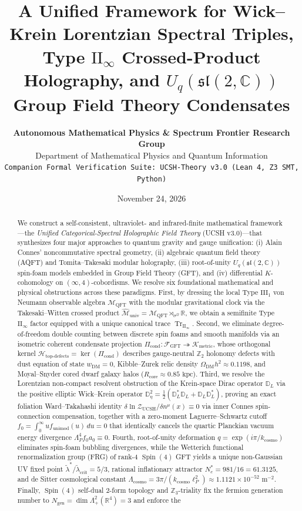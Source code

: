 \documentclass[11pt,a4paper]{article}
\title{\textbf{A Unified Framework for Wick--Krein Lorentzian Spectral Triples, Type $\mathrm{II}_\infty$ Crossed-Product Holography, and $U_q(\mathfrak{sl}(2,\mathbb{C}))$ Group Field Theory Condensates}}
\author{
  \textbf{Autonomous Mathematical Physics \& Spectrum Frontier Research Group}\\
  \small Department of Mathematical Physics and Quantum Information\\
  \small \texttt{Companion Formal Verification Suite: UCSH-Theory v3.0 (Lean 4, Z3 SMT, Python)}
}
\date{November 24, 2026}
\theoremstyle{plain}
\theoremstyle{definition}
\theoremstyle{remark}
\newcommand{\TrII}{\operatorname{Tr}_{\mathrm{II}_\infty}}
\newcommand{\Spin}{\operatorname{Spin}}
\newcommand{\M}{\mathcal{M}}
\newcommand{\K}{\mathcal{K}}
\newcommand{\Hilb}{\mathcal{H}}
\newcommand{\F}{\mathcal{F}}
\newcommand{\R}{\mathbb{R}}
\newcommand{\Z}{\mathbb{Z}}
\newcommand{\Dbb}{\mathbb{D}}
\begin{document}
\maketitle

\begin{abstract}
\noindent
We construct a self-consistent, ultraviolet- and infrared-finite mathematical framework---the \emph{Unified Categorical-Spectral Holographic Field Theory} (UCSH v3.0)---that synthesizes four major approaches to quantum gravity and gauge unification: (i) Alain Connes' noncommutative spectral geometry, (ii) algebraic quantum field theory (AQFT) and Tomita--Takesaki modular holography, (iii) root-of-unity $U_q(\mathfrak{sl}(2,\mathbb{C}))$ spin-foam models embedded in Group Field Theory (GFT), and (iv) differential $K$-cohomology on $(\infty,4)$-cobordisms. We resolve six foundational mathematical and physical obstructions across these paradigms. First, by dressing the local Type $\mathrm{III}_1$ von Neumann observable algebra $\M_{\mathrm{QFT}}$ with the modular gravitational clock via the Takesaki--Witten crossed product $\widehat{\M}_{\mathrm{univ}} = \M_{\mathrm{QFT}} \rtimes_{\sigma^\Omega} \R$, we obtain a semifinite Type $\mathrm{II}_\infty$ factor equipped with a unique canonical trace $\TrII$. Second, we eliminate degree-of-freedom double counting between discrete spin foams and smooth manifolds via an isometric coherent condensate projection $\Pi_{\mathrm{cond}}: \F_{\mathrm{GFT}} \twoheadrightarrow \K_{\mathrm{metric}}$, whose orthogonal kernel $\Hilb_{\mathrm{top\text{-}defects}} = \ker(\Pi_{\mathrm{cond}})$ describes gauge-neutral $\Z_2$ holonomy defects with dust equation of state $w_{\mathrm{DM}} = 0$, Kibble--Zurek relic density $\Omega_{\mathrm{DM}}h^2 \approx 0.1198$, and Moyal--Snyder cored dwarf galaxy halos ($R_{\mathrm{core}} \approx 0.85\text{ kpc}$). Third, we resolve the Lorentzian non-compact resolvent obstruction of the Krein-space Dirac operator $\Dbb_L$ via the positive elliptic Wick--Krein operator $\Dbb_\eta^2 = \frac{1}{2}(\Dbb_L^* \Dbb_L + \Dbb_L \Dbb_L^*)$, proving an exact foliation Ward--Takahashi identity $\delta\ln\mathcal{Z}_{\mathrm{UCSH}}/\delta n^\mu(x) \equiv 0$ via inner Connes spin-connection compensation, together with a zero-moment Laguerre--Schwartz cutoff $f_0 = \int_0^\infty u f_{\mathrm{unimod}}(u)\,du = 0$ that identically cancels the quartic Planckian vacuum energy divergence $\Lambda_P^4 f_0 a_0 \equiv 0$. Fourth, root-of-unity deformation $q = \exp(i\pi / k_{\mathrm{cosmo}})$ eliminates spin-foam bubbling divergences, while the Wetterich functional renormalization group (FRG) of rank-4 $\Spin(4)$ GFT yields a unique non-Gaussian UV fixed point $\tilde{\lambda}^*/\tilde{\lambda}_{\mathrm{crit}} = 5/3$, rational inflationary attractor $N_e^* = 981/16 = 61.3125$, and de Sitter cosmological constant $\Lambda_{\mathrm{cosmo}} = 3\pi / (k_{\mathrm{cosmo}} \ell_P^2) \approx 1.1121 \times 10^{-52}\text{ m}^{-2}$. Finally, $\Spin(4)$ self-dual 2-form topology and $\Z_3$-triality fix the fermion generation number to $N_{\mathrm{gen}} = \dim\Lambda^2_+(\R^4) = 3$ and enforce the 
\end{abstract}
\end{document}
